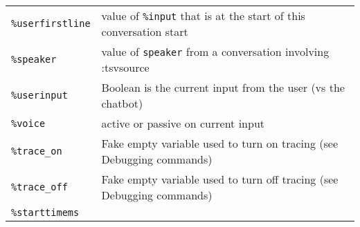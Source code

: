 \documentclass[]{article}
\begin{document}
\begin{longtable}[]{@{}ll@{}}
\begin{minipage}[t]{0.26\columnwidth}
\texttt{\%userfirstline}\strut
\end{minipage} & \begin{minipage}[t]{0.10\columnwidth}\raggedright\strut
value of \texttt{\%input} that is at the start of this conversation
start\strut
\end{minipage}\tabularnewline
\begin{minipage}[t]{0.26\columnwidth}\raggedright\strut
\texttt{\%speaker}\strut
\end{minipage} & \begin{minipage}[t]{0.10\columnwidth}\raggedright\strut
value of \texttt{speaker} from a conversation involving :tsvsource\strut
\end{minipage}\tabularnewline
\begin{minipage}[t]{0.26\columnwidth}\raggedright\strut
\texttt{\%userinput}\strut
\end{minipage} & \begin{minipage}[t]{0.10\columnwidth}\raggedright\strut
Boolean is the current input from the user (vs the chatbot)\strut
\end{minipage}\tabularnewline
\begin{minipage}[t]{0.26\columnwidth}\raggedright\strut
\texttt{\%voice}\strut
\end{minipage} & \begin{minipage}[t]{0.10\columnwidth}\raggedright\strut
active or passive on current input\strut
\end{minipage}\tabularnewline
\begin{minipage}[t]{0.26\columnwidth}\raggedright\strut
\texttt{\%trace\_on}\strut
\end{minipage} & \begin{minipage}[t]{0.10\columnwidth}\raggedright\strut
Fake empty variable used to turn on tracing (see Debugging
commands)\strut
\end{minipage}\tabularnewline
\begin{minipage}[t]{0.26\columnwidth}\raggedright\strut
\texttt{\%trace\_off}\strut
\end{minipage} & \begin{minipage}[t]{0.10\columnwidth}\raggedright\strut
Fake empty variable used to turn off tracing (see Debugging
commands)\strut
\end{minipage}\tabularnewline
\begin{minipage}[t]{0.26\columnwidth}\raggedright\strut
\texttt{\%starttimems}\strut
\end{minipage} & \begin{minipage}[t]{0.10\columnwidth}\raggedright\strut

\end{minipage}
\end{longtable}
\end{document}
